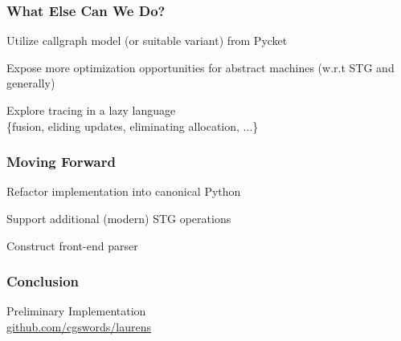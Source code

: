 \documentclass[xetex,serif,mathserif]{beamer}
\newenvironment{slide}[1]{\begin{frame}\frametitle{#1}}{\end{frame}}
\begin{document}
\begin{slide}{What Else Can We Do?}


  \begin{center}
  Utilize callgraph model (or suitable variant) from Pycket

  \vspace{3em}
  
  Expose more optimization opportunities for abstract machines (w.r.t STG and generally)

  \vspace{3em}

  Explore tracing in a lazy language\\
  \{fusion, eliding updates, eliminating allocation, ...\}
  \end{center}
\end{slide}



\begin{slide}{Moving Forward}
  \begin{center}
    Refactor implementation into canonical Python

    \vspace{3em}

    Support additional (modern) STG operations

    \vspace{3em}
    
    Construct front-end parser
  \end{center}
\end{slide}

\begin{slide}{Conclusion}
    \begin{center}
        \textbf{}

        \vspace{2em}
        Preliminary Implementation\\\href{github.com/cgswords/laurens}{github.com/cgswords/laurens}
    \end{center}
\end{slide}
\end{document}
